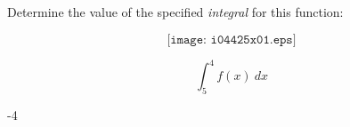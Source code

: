 

Determine the value of the specified {\it integral} for this function:

$$\texttt{[image: i04425x01.eps]}$$

$$\int_{5}^{4} f(x) \> dx$$







-4












